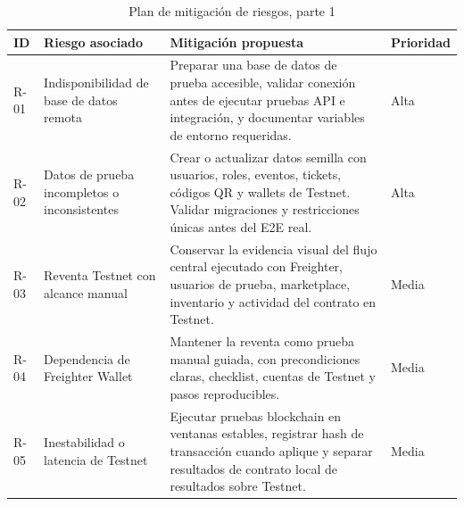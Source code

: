 \documentclass[12pt,letterpaper]{article}
\begin{document}
\begin{table}[H]
\centering
\begingroup
\scriptsize
\setlength{\tabcolsep}{2.5pt}
\renewcommand{\arraystretch}{1.18}

\begin{tabularx}{\textwidth}{|
>{\centering\arraybackslash}p{1.1cm}|
>{\raggedright\arraybackslash}p{3.5cm}|
>{\raggedright\arraybackslash}X|
>{\centering\arraybackslash}p{1.8cm}|}
\hline
\textbf{ID} & \textbf{Riesgo asociado} & \textbf{Mitigación propuesta} & \textbf{Prioridad} \\
\hline
R-01 & Indisponibilidad de base de datos remota & Preparar una base de datos de prueba accesible, validar conexión antes de ejecutar pruebas API e integración, y documentar variables de entorno requeridas. & Alta \\
\hline
R-02 & Datos de prueba incompletos o inconsistentes & Crear o actualizar datos semilla con usuarios, roles, eventos, tickets, códigos QR y wallets de Testnet. Validar migraciones y restricciones únicas antes del E2E real. & Alta \\
\hline
R-03 & Reventa Testnet con alcance manual & Conservar la evidencia visual del flujo central ejecutado con Freighter, usuarios de prueba, marketplace, inventario y actividad del contrato en Testnet. & Media \\
\hline
R-04 & Dependencia de Freighter Wallet & Mantener la reventa como prueba manual guiada, con precondiciones claras, checklist, cuentas de Testnet y pasos reproducibles. & Media \\
\hline
R-05 & Inestabilidad o latencia de Testnet & Ejecutar pruebas blockchain en ventanas estables, registrar hash de transacción cuando aplique y separar resultados de contrato local de resultados sobre Testnet. & Media \\
\hline
\end{tabularx}

\endgroup
\caption{Plan de mitigación de riesgos, parte 1}
\label{tab:mitigacion-riesgos-1}
\end{table}
\end{document}
